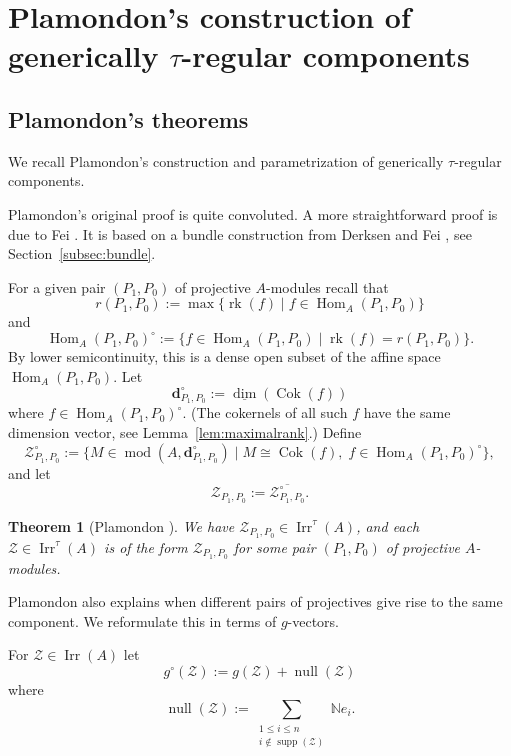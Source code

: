 \documentclass[12pt,reqno]{amsart}
\newtheorem{Thm}{Theorem}[section]
\theoremstyle{definition}
\newcommand{\N}{\mathbb{N}}
\newcommand{\bd}{\mathbf{d}}
\newcommand{\rk}{\operatorname{rk}}
\newcommand{\md}{\operatorname{mod}}
\newcommand{\dimv}{\underline{\dim}}
\newcommand{\supp}{\operatorname{supp}}
\newcommand{\zero}{\operatorname{null}}
\newcommand{\Hom}{\operatorname{Hom}}
\newcommand{\Coker}{\operatorname{Cok}}
\newcommand{\irr}{\operatorname{Irr}}
\newcommand{\calZ}{\mathcal{Z}}
\begin{document}

\section{Plamondon's construction of generically $\tau$-regular
components}\label{sec:taureg}




\subsection{Plamondon's theorems}\label{subsec:plamondon}
We recall Plamondon's construction and parametrization
of generically $\tau$-regular components.

Plamondon's \cite{P13} original proof is quite convoluted.
A more straightforward proof is due to Fei \cite{F23}.
It is based on a bundle construction from Derksen and Fei \cite{DF15}, see Section~\ref{subsec:bundle}.

For a given pair $(P_1,P_0)$ of projective $A$-modules
recall that
$$
r(P_1,P_0) := \max\{ \rk(f) \mid f \in \Hom_A(P_1,P_0) \}
$$
and
$$
\Hom_A(P_1,P_0)^\circ :=
\{ f \in \Hom_A(P_1,P_0) \mid \rk(f) = r(P_1,P_0) \}.
$$
By lower semicontinuity,
this is a dense open subset of the affine space $\Hom_A(P_1,P_0)$.
Let
$$
\bd_{P_1,P_0}^\circ := \dimv(\Coker(f))
$$
where $f \in \Hom_A(P_1,P_0)^\circ$.
(The cokernels of all such $f$ have the same dimension vector, see Lemma~\ref{lem:maximalrank}.)
Define
$$
\calZ_{P_1,P_0}^\circ :=
\{ M \in \md(A,\bd_{P_1,P_0}^\circ) \mid M \cong \Coker(f),\;
f \in \Hom_A(P_1,P_0)^\circ \},
$$
and let
$$
\calZ_{P_1,P_0} := \overline{\calZ_{P_1,P_0}^\circ}.
$$

\begin{Thm}[{Plamondon \cite[Theorem~1.2]{P13}}]\label{thm:plamondon1}
We have
$\calZ_{P_1,P_0} \in \irr^\tau(A)$, and each $\calZ \in \irr^\tau(A)$
is
of the form $\calZ_{P_1,P_0}$ for some pair $(P_1,P_0)$ of
projective $A$-modules.
\end{Thm}

Plamondon also explains when different pairs of projectives give rise
to the same component.
We reformulate this in terms of $g$-vectors.


For $\calZ \in \irr(A)$
let
$$
g^\circ(\calZ) := g(\calZ) + \zero(\calZ)
$$
where
$$
\zero(\calZ) := \sum_{\substack{1 \le i \le n\\i \notin \supp(\calZ)}} \N e_i.
$$
\end{document}
